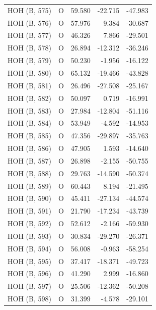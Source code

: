 \begin{longtable}{@{}lcrr@{}}
  \cmidrule(r){1-5}
  HOH (B, 575) & O & 59.580 & -22.715 & -47.983 \\
  \cmidrule(r){1-5}
  HOH (B, 576) & O & 57.976 & 9.384 & -30.687 \\
  \cmidrule(r){1-5}
  HOH (B, 577) & O & 46.326 & 7.866 & -29.501 \\
  \cmidrule(r){1-5}
  HOH (B, 578) & O & 26.894 & -12.312 & -36.246 \\
  \cmidrule(r){1-5}
  HOH (B, 579) & O & 50.230 & -1.956 & -16.122 \\
  \cmidrule(r){1-5}
  HOH (B, 580) & O & 65.132 & -19.466 & -43.828 \\
  \cmidrule(r){1-5}
  HOH (B, 581) & O & 26.496 & -27.508 & -25.167 \\
  \cmidrule(r){1-5}
  HOH (B, 582) & O & 50.097 & 0.719 & -16.991 \\
  \cmidrule(r){1-5}
  HOH (B, 583) & O & 27.984 & -12.804 & -51.116 \\
  \cmidrule(r){1-5}
  HOH (B, 584) & O & 53.949 & -4.592 & -14.953 \\
  \cmidrule(r){1-5}
  HOH (B, 585) & O & 47.356 & -29.897 & -35.763 \\
  \cmidrule(r){1-5}
  HOH (B, 586) & O & 47.905 & 1.593 & -14.640 \\
  \cmidrule(r){1-5}
  HOH (B, 587) & O & 26.898 & -2.155 & -50.755 \\
  \cmidrule(r){1-5}
  HOH (B, 588) & O & 29.763 & -14.590 & -50.374 \\
  \cmidrule(r){1-5}
  HOH (B, 589) & O & 60.443 & 8.194 & -21.495 \\
  \cmidrule(r){1-5}
  HOH (B, 590) & O & 45.411 & -27.134 & -44.574 \\
  \cmidrule(r){1-5}
  HOH (B, 591) & O & 21.790 & -17.234 & -43.739 \\
  \cmidrule(r){1-5}
  HOH (B, 592) & O & 52.612 & -2.166 & -59.930 \\
  \cmidrule(r){1-5}
  HOH (B, 593) & O & 30.834 & -29.270 & -26.371 \\
  \cmidrule(r){1-5}
  HOH (B, 594) & O & 56.008 & -0.963 & -58.254 \\
  \cmidrule(r){1-5}
  HOH (B, 595) & O & 37.417 & -18.371 & -49.723 \\
  \cmidrule(r){1-5}
  HOH (B, 596) & O & 41.290 & 2.999 & -16.860 \\
  \cmidrule(r){1-5}
  HOH (B, 597) & O & 25.506 & -12.362 & -50.208 \\
  \cmidrule(r){1-5}
  HOH (B, 598) & O & 31.399 & -4.578 & -29.101 \\

\end{longtable}
